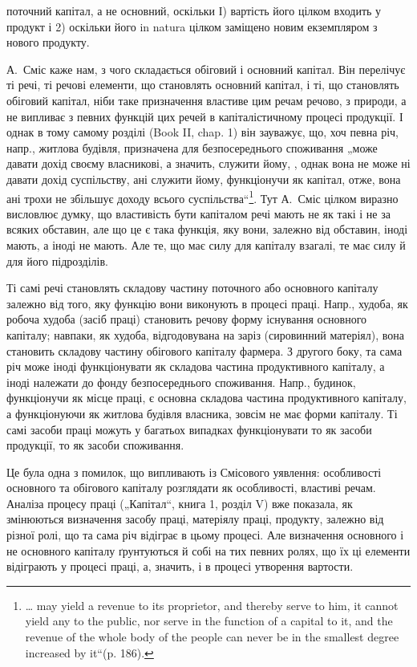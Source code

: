 \parcont{}  %
поточний капітал, а не основний, оскільки І) вартість його цілком входить
у продукт і 2) оскільки його in natura цілком заміщено новим екземпляром
з нового продукту.

А.~Сміс каже нам, з чого складається обіговий і основний капітал.
Він перелічує ті речі, ті речові елементи, що становлять основний капітал,
і ті, що становлять обіговий капітал, ніби таке призначення властиве
цим речам речово, з природи, а не випливає з певних функцій
цих речей в капіталістичному процесі продукції. І однак в тому самому
розділі (Book II, chap. 1) він зауважує, що, хоч певна річ, напр., житлова
будівля, призначена для безпосереднього споживання „може давати
дохід своєму власникові, а значить, служити йому, , однак вона не може ні давати дохід суспільству, ані служити
йому, функціонучи як капітал, отже, вона ані трохи не збільшує доходу
всього суспільства“\footnote*{
\dots{} may yield a revenue to its proprietor, and thereby serve  to him, it cannot yield any to the public, nor serve in the function
of a capital to it, and the revenue of the whole body of the people can never be
in the smallest degree increased by it“(p. 186).
}. Тут А.~Сміс цілком виразно висловлює думку, що
властивість бути капіталом речі мають не як такі і не за всяких обставин,
але що це є така функція, яку вони, залежно від обставин, іноді мають,
а іноді не мають. Але те, що має силу для капіталу взагалі, те має
силу й для його підрозділів.

Ті самі речі становлять складову частину поточного або основного
капіталу залежно від того, яку функцію вони виконують в процесі праці.
Напр., худоба, як робоча худоба (засіб праці) становить речову форму
існування основного капіталу; навпаки, як худоба, відгодовувана на
заріз (сировинний матеріял), вона становить складову частину обігового
капіталу фармера. З другого боку, та сама річ може іноді функціонувати
як складова частина продуктивного капіталу, а іноді належати до
фонду безпосереднього споживання. Напр., будинок, функціонучи як місце
праці, є основна складова частина продуктивного капіталу, а функціонуючи
як житлова будівля власника, зовсім не має форми капіталу.
Ті самі засоби праці можуть у багатьох випадках функціонувати то як
засоби продукції, то як засоби споживання.

Це була одна з помилок, що випливають із Смісового уявлення: особливості
основного та обігового капіталу розглядати як особливості,
властиві речам. Аналіза процесу праці („Капітал“, книга 1, розділ V)
вже показала, як змінюються визначення засобу праці, матеріялу праці,
продукту, залежно від різної ролі, що та сама річ відіграє в цьому
процесі. Але визначення основного і не основного капіталу ґрунтуються
й собі на тих певних ролях, що їх ці елементи відіграють у процесі праці,
а, значить, і в процесі утворення вартости.

